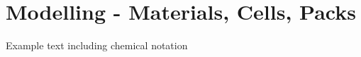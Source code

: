 \section{Modelling - Materials, Cells, Packs}\label{sec:modelling}
{\color{green} Example text including chemical notation\cite{Schlueter2018} }